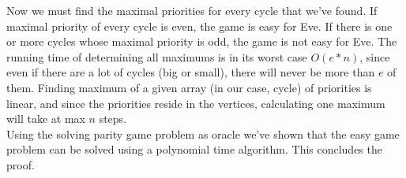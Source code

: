 \documentclass{article}
\begin{document}
Now we must find the maximal priorities for every cycle that we've found. If maximal priority of every cycle is even, the game is easy for Eve. If there is one or more cycles whose maximal priority is odd, the game is not easy for Eve. The running time of determining all maximums is in its worst case $O(e * n)$, since even if there are a lot of cycles (big or small), there will never be more than $e$ of them. Finding maximum of a given array (in our case, cycle) of priorities is linear, and since the priorities reside in the vertices, calculating one maximum will take at max $n$ steps. \\

Using the solving parity game problem as oracle we've shown that the easy game problem can be solved using a polynomial time algorithm. This concludes the proof.
\end{document}
